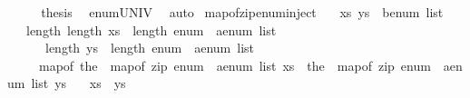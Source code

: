 \begin{isabellebody}
\ \ \isamarkupfalse%
\ \isamarkupfalse%
\ {\isacharquery}{\kern0pt}thesis\ \isamarkupfalse%
\ enum{\isacharunderscore}{\kern0pt}UNIV\ \isamarkupfalse%
\ auto\isanewline
{}\isamarkupfalse%
%
\endisatagproof
{\isafoldproof}%
%
\isadelimproof
\isanewline
%
\endisadelimproof
\isanewline
{}\isamarkupfalse%
\ map{\isacharunderscore}{\kern0pt}of{\isacharunderscore}{\kern0pt}zip{\isacharunderscore}{\kern0pt}enum{\isacharunderscore}{\kern0pt}inject{\isacharcolon}{\kern0pt}\isanewline
\ \ \ xs\ ys\ {\isacharcolon}{\kern0pt}{\isacharcolon}{\kern0pt}\ {\isachardoublequoteopen}{\isacharprime}{\kern0pt}b{\isacharcolon}{\kern0pt}{\isacharcolon}{\kern0pt}enum\ list{\isachardoublequoteclose}\isanewline
\ \ \ length{\isacharcolon}{\kern0pt}\ {\isachardoublequoteopen}length\ xs\ {\isacharequal}{\kern0pt}\ length\ {\isacharparenleft}{\kern0pt}enum\ {\isacharcolon}{\kern0pt}{\isacharcolon}{\kern0pt}\ {\isacharprime}{\kern0pt}a{\isacharcolon}{\kern0pt}{\isacharcolon}{\kern0pt}enum\ list{\isacharparenright}{\kern0pt}{\isachardoublequoteclose}\isanewline
\ \ \ \ \ \ {\isachardoublequoteopen}length\ ys\ {\isacharequal}{\kern0pt}\ length\ {\isacharparenleft}{\kern0pt}enum\ {\isacharcolon}{\kern0pt}{\isacharcolon}{\kern0pt}\ {\isacharprime}{\kern0pt}a{\isacharcolon}{\kern0pt}{\isacharcolon}{\kern0pt}enum\ list{\isacharparenright}{\kern0pt}{\isachardoublequoteclose}\isanewline
\ \ \ \ \ map{\isacharunderscore}{\kern0pt}of{\isacharcolon}{\kern0pt}\ {\isachardoublequoteopen}the\ {\isasymcirc}\ map{\isacharunderscore}{\kern0pt}of\ {\isacharparenleft}{\kern0pt}zip\ {\isacharparenleft}{\kern0pt}enum\ {\isacharcolon}{\kern0pt}{\isacharcolon}{\kern0pt}\ {\isacharprime}{\kern0pt}a{\isacharcolon}{\kern0pt}{\isacharcolon}{\kern0pt}enum\ list{\isacharparenright}{\kern0pt}\ xs{\isacharparenright}{\kern0pt}\ {\isacharequal}{\kern0pt}\ the\ {\isasymcirc}\ map{\isacharunderscore}{\kern0pt}of\ {\isacharparenleft}{\kern0pt}zip\ {\isacharparenleft}{\kern0pt}enum\ {\isacharcolon}{\kern0pt}{\isacharcolon}{\kern0pt}\ {\isacharprime}{\kern0pt}a{\isacharcolon}{\kern0pt}{\isacharcolon}{\kern0pt}enum\ list{\isacharparenright}{\kern0pt}\ ys{\isacharparenright}{\kern0pt}{\isachardoublequoteclose}\isanewline
\ \ \ {\isachardoublequoteopen}xs\ {\isacharequal}{\kern0pt}\ ys{\isachardoublequoteclose}\isanewline
%
\isadelimproof
%
\endisadelimproof
%
\isatagproof
{}\isamarkupfalse%
\ {\isacharminus}{\kern0pt}\isanewline
\ \ \isamarkupfalse%

\end{isabellebody}
